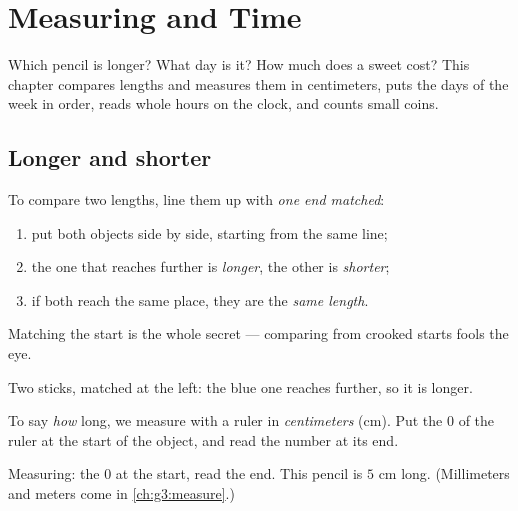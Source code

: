 \chapter{Measuring and Time}\label{ch:g1:measure}

Which pencil is longer? What day is it? How much does a sweet cost?
This chapter compares lengths and measures them in centimeters,
puts the days of the week in order, reads whole hours on the clock,
and counts small coins.

\section{Longer and shorter}

\begin{method}\label{met:g1:measure:compare}
To compare two lengths, line them up with \emph{one end matched}:
\begin{enumerate}
  \item put both objects side by side, starting from the same line;
  \item the one that reaches further is \emph{longer}, the other is
        \emph{shorter};
  \item if both reach the same place, they are the \emph{same
        length}.
\end{enumerate}
Matching the start is the whole secret --- comparing from crooked
starts fools the eye.
\end{method}

\begin{omfigure}

{\small Two sticks, matched at the left: the blue one reaches
further, so it is longer.}
\end{omfigure}

\begin{definition}\label{def:g1:measure:cm}
To say \emph{how} long, we measure with a ruler in
\emph{centimeters} (cm). Put the $0$ of the ruler at the start of
the object, and read the number at its end.
\end{definition}

\begin{omfigure}

{\small Measuring: the $0$ at the start, read the end. This pencil
is $5$ cm long. (Millimeters and meters come in
\cref{ch:g3:measure}.)}
\end{omfigure}

